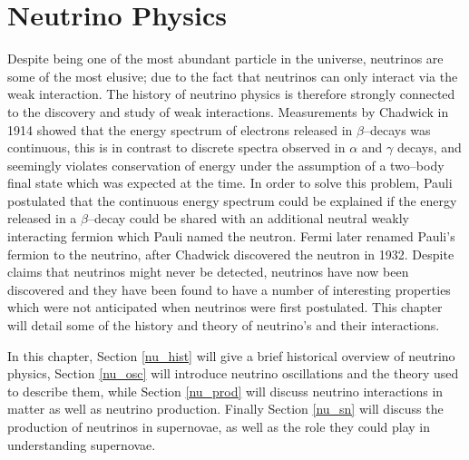 \chapter{\label{ch:2-neutrinophysics}Neutrino Physics} 


 


Despite being one of the most abundant particle in the universe, neutrinos are 
some of the most elusive; due to the fact that neutrinos can only interact via
the weak interaction. The history of neutrino physics is therefore strongly
connected to the discovery and study of weak interactions. Measurements by
Chadwick in 1914 showed that the energy spectrum of electrons released in
\(\beta\)--decays was continuous, this is in contrast to discrete spectra
observed in \(\alpha\) and \(\gamma\) decays, and seemingly violates
conservation of energy under the assumption of a two--body final state which was
expected at the time. In order to solve this problem, Pauli postulated that the 
continuous energy spectrum could be explained if the energy released in a 
\(\beta\)--decay could be shared with an additional neutral weakly interacting 
fermion which Pauli named the neutron. Fermi later renamed Pauli's fermion to 
the neutrino, after Chadwick discovered the neutron in 1932. Despite claims that 
neutrinos might never be detected, neutrinos have now been discovered and they 
have been found to have a number of interesting properties which were not 
anticipated when neutrinos were first postulated. This chapter will detail 
some of the history and theory of neutrino's and their interactions.

In this chapter, Section \ref{nu_hist} will give a brief historical overview of 
neutrino physics, Section \ref{nu_osc} will introduce neutrino oscillations
and the theory used to describe them, while Section \ref{nu_prod} will discuss
neutrino interactions in matter as well as neutrino production. Finally Section
\ref{nu_sn} will discuss the production of neutrinos in supernovae, as well as
the role they could play in understanding supernovae.


